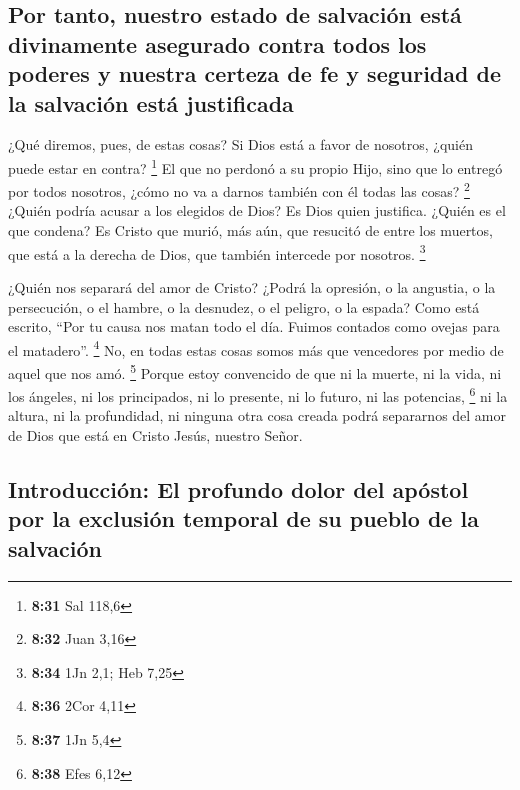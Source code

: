 \hypertarget{por-tanto-nuestro-estado-de-salvaciuxf3n-estuxe1-divinamente-asegurado-contra-todos-los-poderes-y-nuestra-certeza-de-fe-y-seguridad-de-la-salvaciuxf3n-estuxe1-justificada}{%
\subsection{Por tanto, nuestro estado de salvación está divinamente
asegurado contra todos los poderes y nuestra certeza de fe y seguridad
de la salvación está
justificada}\label{por-tanto-nuestro-estado-de-salvaciuxf3n-estuxe1-divinamente-asegurado-contra-todos-los-poderes-y-nuestra-certeza-de-fe-y-seguridad-de-la-salvaciuxf3n-estuxe1-justificada}}

 ¿Qué diremos, pues, de estas cosas? Si Dios está a favor
de nosotros, ¿quién puede estar en contra? \footnote{\textbf{8:31} Sal
  118,6}  El que no perdonó a su propio Hijo, sino que lo
entregó por todos nosotros, ¿cómo no va a darnos también con él todas
las cosas? \footnote{\textbf{8:32} Juan 3,16}  ¿Quién
podría acusar a los elegidos de Dios? Es Dios quien justifica.
 ¿Quién es el que condena? Es Cristo que murió, más aún,
que resucitó de entre los muertos, que está a la derecha de Dios, que
también intercede por nosotros. \footnote{\textbf{8:34} 1Jn 2,1; Heb
  7,25}

 ¿Quién nos separará del amor de Cristo? ¿Podrá la
opresión, o la angustia, o la persecución, o el hambre, o la desnudez, o
el peligro, o la espada?  Como está escrito, ``Por tu
causa nos matan todo el día. Fuimos contados como ovejas para el
matadero''. \footnote{\textbf{8:36} 2Cor 4,11}  No, en
todas estas cosas somos más que vencedores por medio de aquel que nos
amó. \footnote{\textbf{8:37} 1Jn 5,4}  Porque estoy
convencido de que ni la muerte, ni la vida, ni los ángeles, ni los
principados, ni lo presente, ni lo futuro, ni las potencias, \footnote{\textbf{8:38}
  Efes 6,12}  ni la altura, ni la profundidad, ni ninguna
otra cosa creada podrá separarnos del amor de Dios que está en Cristo
Jesús, nuestro Señor.

\hypertarget{introducciuxf3n-el-profundo-dolor-del-apuxf3stol-por-la-exclusiuxf3n-temporal-de-su-pueblo-de-la-salvaciuxf3n}{%
\subsection{Introducción: El profundo dolor del apóstol por la exclusión
temporal de su pueblo de la
salvación}\label{introducciuxf3n-el-profundo-dolor-del-apuxf3stol-por-la-exclusiuxf3n-temporal-de-su-pueblo-de-la-salvaciuxf3n}}

